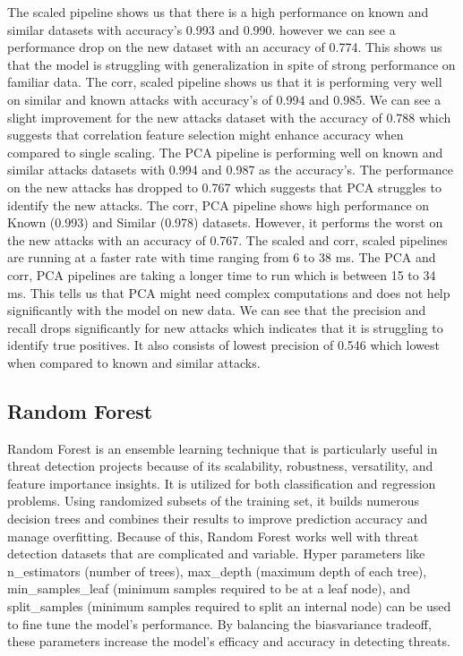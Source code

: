\documentclass[journal]{IEEEtran}
\begin{document}


The scaled pipeline shows us that there is a high performance on known and similar datasets with accuracy's 0.993 and 0.990.
however we can see a performance drop on the new dataset with an accuracy of 0.774. This shows us that the model is struggling with generalization in spite of strong performance on familiar data. The corr, scaled pipeline shows us that it is performing very well on similar and known attacks with accuracy's of 0.994 and 0.985. We can see a slight improvement for the new attacks dataset with the accuracy of 0.788 which suggests that correlation feature selection  might enhance accuracy when compared to single scaling. The PCA pipeline is performing well on known and similar attacks datasets with 0.994 and 0.987 as the accuracy's. The performance on the new attacks has dropped to 0.767 which suggests that PCA struggles to identify the new attacks. The corr, PCA pipeline shows high performance on Known (0.993) and Similar (0.978) datasets. However, it performs the worst on the new attacks with an accuracy of 0.767. The scaled and corr, scaled pipelines are running at a faster rate with time ranging from 6 to 38 ms. The PCA and corr, PCA pipelines are taking a longer time to run which is between 15 to 34 ms. This tells us that PCA might need complex computations and does not help significantly with the model on new data. We can see that the precision and recall drops significantly for new attacks which indicates that it is struggling to identify true positives. It also consists of lowest precision of 0.546 which lowest when compared to known and similar attacks.

\subsection{Random Forest}

Random Forest is an ensemble learning technique that is particularly useful in threat detection projects because of its scalability, robustness, versatility, and feature importance insights. It is utilized for both classification and regression problems. Using randomized subsets of the training set, it builds numerous decision trees and combines their results to improve prediction accuracy and manage overfitting. Because of this, Random Forest works well with threat detection datasets that are complicated and variable. Hyper parameters like n\_estimators (number of trees), max\_depth (maximum depth of each tree), min\_samples\_leaf (minimum samples required to be at a leaf node), and split\_samples (minimum samples required to split an internal node) can be used to fine tune the model's performance. By balancing the bias\-variance trade\-off, these parameters increase the model's efficacy and accuracy in detecting threats.
\end{document}
